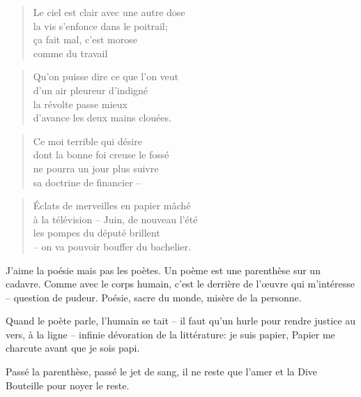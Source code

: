   \begin{verse}
    Le ciel est clair avec une autre dose\\
    la vis s’enfonce dans le poitrail;\\
    ça fait mal, c’est morose\\
    comme du travail
  \end{verse}
  \begin{verse}
    Qu’on puisse dire ce que l’on veut\\
    d’un air pleureur d’indigné\\
    la révolte passe mieux\\
    d’avance les deux mains clouées.
  \end{verse}
  \begin{verse}
    Ce moi terrible qui désire\\
    dont la bonne foi creuse le fossé\\
    ne pourra un jour plus suivre\\
    sa doctrine de financier --
  \end{verse}
  \begin{verse}
    Éclats de merveilles en papier mâché\\
    à la télévision -- Juin, de nouveau l’été\\
    les pompes du député brillent\\
    -- on va pouvoir bouffer du bachelier.
  \end{verse}

  J’aime la poésie mais pas les poètes. Un poème est une parenthèse sur
  un cadavre. Comme avec le corps humain, c’est le derrière de l’œuvre
  qui m’intéresse -- question de pudeur. Poésie, sacre du monde,
  misère de la personne.

  Quand le poète parle, l’humain se tait -- il faut qu’un 
  hurle pour rendre justice au vers, à la ligne -- infinie dévoration de la
  littérature: je suis papier, Papier me charcute avant que je sois papi.

  Passé la parenthèse, passé le jet de sang, il ne reste que l’amer et la
  Dive Bouteille pour noyer le reste.
